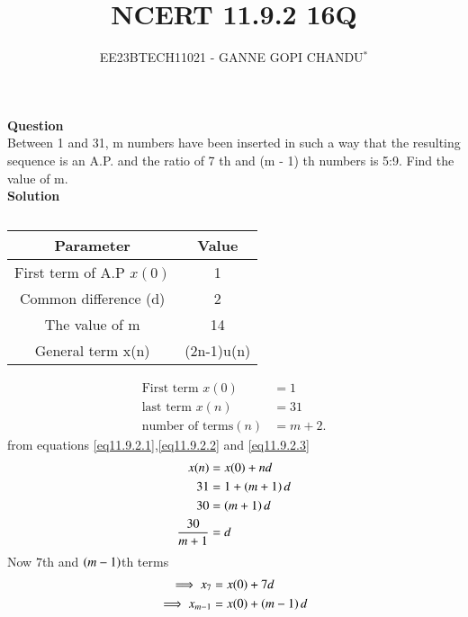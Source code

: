 \documentclass[journal,12pt,twocolumn]{IEEEtran}
\theoremstyle{remark}
\begin{document}

\vspace{3cm}
\title{NCERT 11.9.2 16Q}
\author{EE23BTECH11021 - GANNE GOPI CHANDU$^{*}$%
}
\maketitle
\newpage
\bigskip
\renewcommand{\thefigure}{\theenumi}
\renewcommand{\thetable}{\theenumi}

\textbf{Question}\\
Between 1 and 31, m numbers have been inserted in such a way that the resulting sequence is an A.P. and 
the ratio of 7
th and (m - 1)
th numbers is 5:9. Find the value of m.\\
\textbf{Solution}\\
\begin{table}[h!]
\begin{center}
\renewcommand\thetable{1}
\begin{tabular}{ |c|c|  } 
  \hline
    Parameter & Value  \\ 
  \hline
  First term of A.P $x(0)$ & 1  \\ 
  \hline
  Common difference (d) & 2 \\ 
  \hline
  The value of m & 14 \\
  \hline
  General term x(n) & (2n-1)u(n)\\
  \hline
\end{tabular}
\end{center}
\caption{}
\end{table}
\begin{align}
\text{First term } x(0) &= 1\label{eq11.9.2.1}\\
\text{last term } x(n) &= 31\label{eq11.9.2.2}\\
\text{number of terms}( n) &= m + 2.\label{eq11.9.2.3}
\end{align}
from equations \ref{eq11.9.2.1},\ref{eq11.9.2.2} and \ref{eq11.9.2.3}\\
\begin{align}
x(n)&=x(0)+nd\\
31 &= 1 + \left(m + 1\right)d \\
30 &= \left(m + 1\right)d \\
\frac{30}{m + 1} &= d \label{eq11.9.2.7}
\end{align}
Now $7$th and $\left(m-1\right)$th terms
\begin{align}
\implies x_7 &= x(0) + 7d\label{eq11.9.2.8}\\
\implies x_{m-1} &= x(0) + \left(m-1\right)d\label{eq11.9.2.9}
\end{align}
\end{document}
